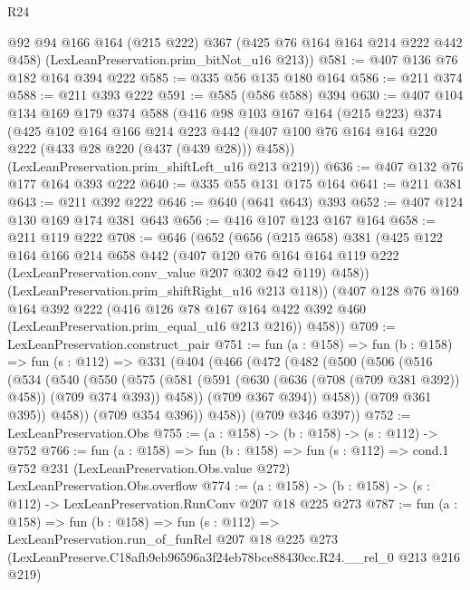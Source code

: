 \begin{lexlean}{R24}
\begin{coremodule}
      @92
      @94
      @166
      @164
      (@215 @222)
      @367
      (@425 @76 @164 @164 @214 @222 @442 @458)
      (LexLeanPreservation.prim_bitNot_u16 @213))
@581 := @407 @136 @76 @182 @164 @394 @222
@585 := @335 @56 @135 @180 @164
@586 := @211 @374
@588 := @211 @393 @222
@591 := @585 (@586 @588) @394
@630 := @407
    @104
    @134
    @169
    @179
    @374
    @588
    (@416
      @98
      @103
      @167
      @164
      (@215 @223)
      @374
      (@425
        @102
        @164
        @166
        @214
        @223
        @442
        (@407 @100 @76 @164 @164 @220 @222 (@433 @28 @220 (@437 (@439 @28))) @458))
      (LexLeanPreservation.prim_shiftLeft_u16 @213 @219))
@636 := @407 @132 @76 @177 @164 @393 @222
@640 := @335 @55 @131 @175 @164
@641 := @211 @381
@643 := @211 @392 @222
@646 := @640 (@641 @643) @393
@652 := @407 @124 @130 @169 @174 @381 @643
@656 := @416 @107 @123 @167 @164
@658 := @211 @119 @222
@708 := @646
    (@652
      (@656
        (@215 @658)
        @381
        (@425
          @122
          @164
          @166
          @214
          @658
          @442
          (@407
            @120
            @76
            @164
            @164
            @119
            @222
            (LexLeanPreservation.conv_value @207 @302 @42 @119)
            @458))
        (LexLeanPreservation.prim_shiftRight_u16 @213 @118))
      (@407
        @128
        @76
        @169
        @164
        @392
        @222
        (@416 @126 @78 @167 @164 @422 @392 @460 (LexLeanPreservation.prim_equal_u16 @213 @216))
        @458))
@709 := LexLeanPreservation.construct_pair
@751 := fun (a : @158) =>
  fun (b : @158) =>
  fun (s : @112) =>
  @331
    (@404
      (@466
        (@472
          (@482
            (@500
              (@506
                (@516
                  (@534
                    (@540
                      (@550
                        (@575
                          (@581
                            (@591 (@630 (@636 (@708 (@709 @381 @392)) @458)) (@709 @374 @393))
                            @458))
                        (@709 @367 @394))
                      @458))
                  (@709 @361 @395))
                @458))
            (@709 @354 @396))
          @458))
      (@709 @346 @397))
@752 := LexLeanPreservation.Obs
@755 := (a : @158) -> (b : @158) -> (s : @112) -> @752
@766 := fun (a : @158) =>
  fun (b : @158) =>
  fun (s : @112) =>
  cond.{1} @752 @231 (LexLeanPreservation.Obs.value @272) LexLeanPreservation.Obs.overflow
@774 := (a : @158) -> (b : @158) -> (s : @112) -> LexLeanPreservation.RunConv @207 @18 @225 @273
@787 := fun (a : @158) =>
  fun (b : @158) =>
  fun (s : @112) =>
  LexLeanPreservation.run_of_funRel
    @207
    @18
    @225
    @273
    (LexLeanPreserve.C18afb9eb96596a3f24eb78bce88430cc.R24.__rel_0 @213 @216 @219)
\end{coremodule}
\end{lexlean}
